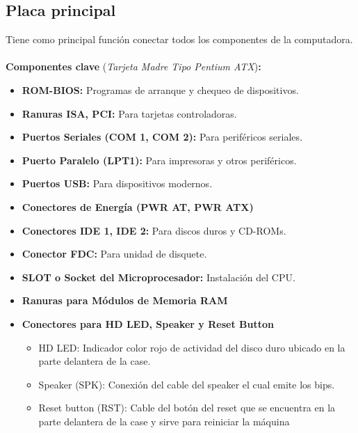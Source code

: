 \documentclass{templateNote}
\begin{document}
\subsection{Placa principal}
\noindent Tiene como principal función conectar todos los componentes de la computadora.\\\\
\textbf{Componentes clave} (\textit{Tarjeta Madre Tipo Pentium ATX})\textbf{:}
\begin{itemize}
    \item \textbf{ROM-BIOS:} Programas de arranque y chequeo de dispositivos.
    \item \textbf{Ranuras ISA, PCI:} Para tarjetas controladoras.
    \item \textbf{Puertos Seriales (COM 1, COM 2):} Para periféricos seriales.
    \item \textbf{Puerto Paralelo (LPT1):} Para impresoras y otros periféricos.
    \item \textbf{Puertos USB:} Para dispositivos modernos.
    \item \textbf{Conectores de Energía (PWR AT, PWR ATX)}
    \item \textbf{Conectores IDE 1, IDE 2:} Para discos duros y CD-ROMs.
    \item \textbf{Conector FDC:} Para unidad de disquete.
    \item \textbf{SLOT o Socket del Microprocesador:} Instalación del CPU.
    \item \textbf{Ranuras para Módulos de Memoria RAM}
    \item \textbf{Conectores para HD LED, Speaker y Reset Button}
    \begin{itemize}
        \item HD LED: Indicador color rojo de actividad del disco duro ubicado en 
        la parte delantera de la case.
        \item Speaker (SPK): Conexión del cable del speaker el cual emite los bips.
        \item Reset button (RST): Cable del botón del reset que se encuentra en la parte delantera de la case y sirve para reiniciar la máquina
    \end{itemize}
\end{itemize}
\end{document}

